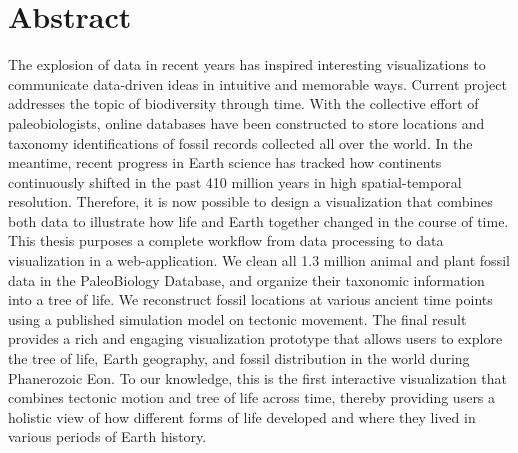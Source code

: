 
\chapter{Abstract} \label{chp:abstract}

The explosion of data in recent years has inspired interesting visualizations to communicate data-driven ideas in intuitive and memorable ways. Current project addresses the topic of biodiversity through time. With the collective effort of paleobiologists, online databases have been constructed to store locations and taxonomy identifications of fossil records collected all over the world. In the meantime, recent progress in Earth science has tracked how continents continuously shifted in the past 410 million years in high spatial-temporal resolution. Therefore, it is now possible to design a visualization that combines both data to illustrate how life and Earth together changed in the course of time. \\

This thesis purposes a complete workflow from data processing to data visualization in a web-application. We clean all 1.3 million animal and plant fossil data in the PaleoBiology Database, and organize their taxonomic information into a tree of life.  We reconstruct fossil locations at various ancient time points using a published simulation model on tectonic movement. The final result provides a rich and engaging visualization prototype that allows users to explore the tree of life, Earth geography, and fossil distribution in the world during Phanerozoic Eon. To our knowledge, this is the first interactive visualization that combines tectonic motion and tree of life across time, thereby providing users a holistic view of how different forms of life developed and where they lived in various periods of Earth history.
